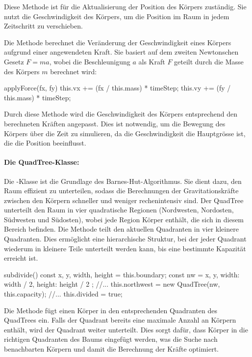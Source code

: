 \documentclass[a4paper,12pt,twoside]{article}
\begin{document}
Diese Methode ist für die Aktualisierung der Position des Körpers zuständig. 
Sie nutzt die Geschwindigkeit des Körpers, um die Position im Raum in jedem 
Zeitschritt zu verschieben.

Die Methode  berechnet die Veränderung der 
Geschwindigkeit eines Körpers aufgrund einer angewendeten Kraft. Sie basiert auf 
dem zweiten Newtonschen Gesetz \(F = ma\), wobei die Beschleunigung \(a\) 
als Kraft \(F\) geteilt durch die Masse des Körpers \(m\) berechnet wird:

\begin{javascript}
applyForce(fx, fy) {
    this.vx += (fx / this.mass) * timeStep;
    this.vy += (fy / this.mass) * timeStep;
}
\end{javascript}

Durch diese Methode wird die Geschwindigkeit des Körpers entsprechend den berechneten 
Kräften angepasst. Dies ist notwendig, um die Bewegung des Körpers über die Zeit zu 
simulieren, da die Geschwindigkeit die Hauptgrösse ist, die die Position beeinflusst.

\paragraph{Die QuadTree-Klasse:}
Die -Klasse ist die Grundlage des Barnes-Hut-Algorithmus. 
Sie dient dazu, den Raum effizient zu unterteilen, sodass die Berechnungen 
der Gravitationskräfte zwischen den Körpern schneller und weniger rechenintensiv sind. 
Der QuadTree unterteilt den Raum in vier quadratische Regionen 
(Nordwesten, Nordosten, Südwesten und Südosten), wobei jede Region Körper enthält, 
die sich in diesem Bereich befinden. Die Methode  
teilt den aktuellen Quadranten in vier kleinere Quadranten. Dies ermöglicht eine 
hierarchische Struktur, bei der jeder Quadrant wiederum in kleinere Teile unterteilt 
werden kann, bis eine bestimmte Kapazität erreicht ist.

\begin{javascript}
subdivide() {
    const { x, y, width, height } = this.boundary;
    const nw = { x, y, width: width / 2, height: height / 2 };
	//...
    this.northwest = new QuadTree(nw, this.capacity);
	//...
    this.divided = true;
}
\end{javascript}

Die Methode  fügt einen Körper in den entsprechenden 
Quadranten des QuadTrees ein. Falls der Quadrant bereits eine maximale Anzahl an 
Körpern enthält, wird der Quadrant weiter unterteilt. Dies sorgt dafür, dass Körper 
in die richtigen Quadranten des Baums eingefügt werden, was die Suche nach benachbarten 
Körpern und damit die Berechnung der Kräfte optimiert.
\end{document}
